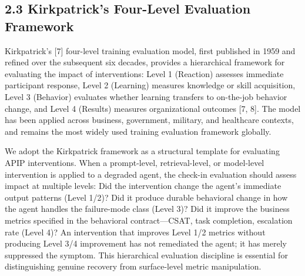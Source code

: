 \subsection{2.3  Kirkpatrick's Four-Level Evaluation Framework}

Kirkpatrick's [7] four-level training evaluation model, first published in 1959 and refined over the subsequent six decades, provides a hierarchical framework for evaluating the impact of interventions: Level 1 (Reaction) assesses immediate participant response, Level 2 (Learning) measures knowledge or skill acquisition, Level 3 (Behavior) evaluates whether learning transfers to on-the-job behavior change, and Level 4 (Results) measures organizational outcomes [7, 8]. The model has been applied across business, government, military, and healthcare contexts, and remains the most widely used training evaluation framework globally.

We adopt the Kirkpatrick framework as a structural template for evaluating APIP interventions. When a prompt-level, retrieval-level, or model-level intervention is applied to a degraded agent, the check-in evaluation should assess impact at multiple levels: Did the intervention change the agent's immediate output patterns (Level 1/2)? Did it produce durable behavioral change in how the agent handles the failure-mode class (Level 3)? Did it improve the business metrics specified in the behavioral contract---CSAT, task completion, escalation rate (Level 4)? An intervention that improves Level 1/2 metrics without producing Level 3/4 improvement has not remediated the agent; it has merely suppressed the symptom. This hierarchical evaluation discipline is essential for distinguishing genuine recovery from surface-level metric manipulation.

